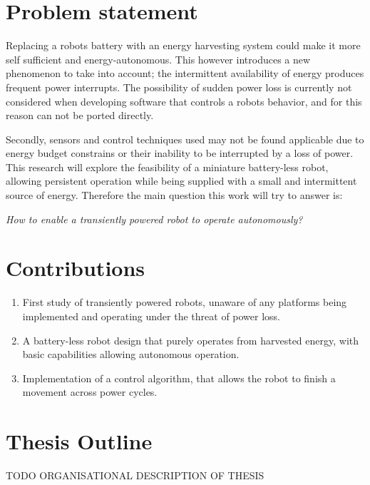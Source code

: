 \newpage

\section{Problem statement}



Replacing a robots battery with an energy harvesting system could make it more self sufficient and energy-autonomous. 
This however introduces a new phenomenon to take into account; the intermittent availability of energy produces frequent power interrupts.
The possibility of sudden power loss is currently not considered when developing software that controls a robots behavior, and for this reason can not be ported directly.
\hfill \break

Secondly, sensors and control techniques used may not be found applicable due to energy budget constrains or their inability to be interrupted by a loss of power. 
This research will explore the feasibility of a miniature battery-less robot, allowing persistent operation while being supplied with a small and intermittent source of energy.
Therefore the main question this work will try to answer is:

\begin{center}
	\textit{How to enable a transiently powered robot to operate autonomously?}
\end{center}

\section{Contributions}

\begin{enumerate}

\item First study of transiently powered robots, unaware of any platforms being implemented and operating under the threat of power loss. 

\item A battery-less robot design that purely operates from harvested energy, with basic capabilities allowing autonomous operation.

\item Implementation of a control algorithm, that allows the robot to finish a movement across power cycles.



\end{enumerate}


\section{Thesis Outline}


\vspace{1\baselineskip}

\noindent
TODO ORGANISATIONAL DESCRIPTION OF THESIS


